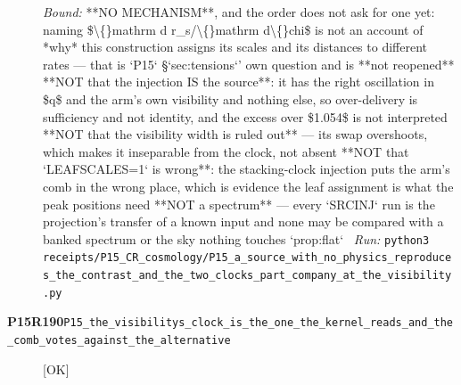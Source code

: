 \begin{description}
 \emph{Bound:}  **NO MECHANISM**, and the order does not ask for one yet: naming \$\textbackslash\{\}mathrm d r\_s/\textbackslash\{\}mathrm d\textbackslash\{\}chi\$ is not an account of *why* this construction assigns its scales and its distances to different rates --- that is `P15` \S{}`sec:tensions`' own question and is **not reopened**  **NOT that the injection IS the source**: it has the right oscillation in \$q\$ and the arm's own visibility and nothing else, so over-delivery is sufficiency and not identity, and the excess over \$1.054\$ is not interpreted  **NOT that the visibility width is ruled out** --- its swap overshoots, which makes it inseparable from the clock, not absent  **NOT that `LEAFSCALES=1` is wrong**: the stacking-clock injection puts the arm's comb in the wrong place, which is evidence the leaf assignment is what the peak positions need  **NOT a spectrum** --- every `SRCINJ` run is the projection's transfer of a known input and none may be compared with a banked spectrum or the sky  nothing touches `prop:flat`
\ \emph{Run:} \texttt{python3 receipts/P15\_CR\_cosmology/P15\_a\_source\_with\_no\_physics\_reproduces\_the\_contrast\_and\_the\_two\_clocks\_part\_company\_at\_the\_visibility.py}
\item[\rcptlabel{P15_the_visibilitys_clock_is_the_one_the_kernel_reads_and_the_comb_votes_against_the_alternative}{P15R190}\textbf{P15R190}\quad\texttt{P15\_the\_visibilitys\_clock\_is\_the\_one\_the\_kernel\_reads\_and\_the\_comb\_votes\_against\_the\_alternative}]\hfill\textsf{[OK]}\\

\end{description}
